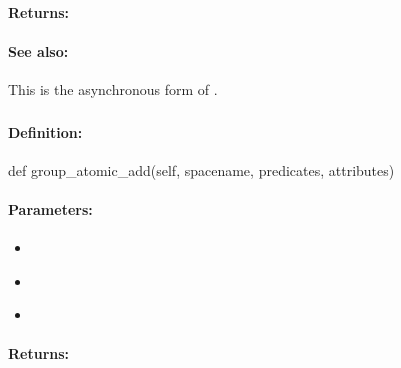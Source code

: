 \paragraph{Returns:}


\paragraph{See also:}  This is the asynchronous form of .

\pagebreak
\subsubsection{}
\label{api:python:group_atomic_add}


\paragraph{Definition:}
\begin{pythoncode}
def group_atomic_add(self, spacename, predicates, attributes)
\end{pythoncode}

\paragraph{Parameters:}
\begin{itemize}[noitemsep]
\item {}\\

\item {}\\

\item {}\\

\end{itemize}

\paragraph{Returns:}


\pagebreak
\subsubsection{}
\label{api:python:async_group_atomic_add}


